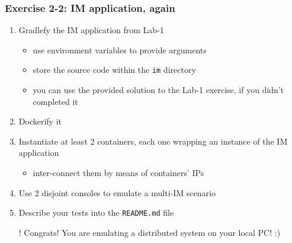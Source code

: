 \documentclass[handout]{beamer}\mode<presentation>{\usetheme{AMSCesenaBleu}}
\begin{document}
\begin{frame}%
\frametitle{Exercise 2-2: IM application, again}

    \begin{enumerate}
        \item Gradlefy the IM application from Lab-1
        \begin{itemize}
            \item use environment variables to provide arguments
            \item store the source code within the \texttt{im} directory
            \item you can use the provided solution to the Lab-1 exercise, if you didn't completed it
        \end{itemize}
        
        \item Dockerify it
        
        \item Instantiate at least 2 containers, each one wrapping an instance of the IM application
        \begin{itemize}
            \item inter-connect them by means of containers' IPs
        \end{itemize}
        
        \item Use 2 disjoint consoles to emulate a multi-IM scenario
        
        \item Describe your tests into the \texttt{README.md} file
        
        \vspace{1cm}
        
        
        
        \item[!] Congrats! You are emulating a distributed system on your local PC! :)
    \end{enumerate}

\end{frame}

\maketitle

\end{document}
